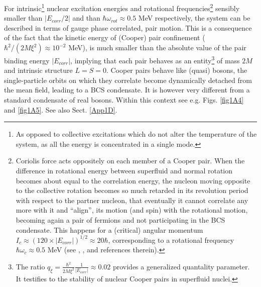 For intrinsic\footnote{As opposed to collective excitations which do not alter the temperature of the system, as all the energy is concentrated in a single mode.} nuclear excitation energies and rotational frequencies\footnote{Coriolis force acts oppositely on each member of a Cooper pair. When the difference in rotational energy between superfluid and normal rotation becomes about equal to the correlation energy, the nucleon moving opposite to the collective rotation becomes so much retarded in its revolution period with respect to the partner nucleon, that eventually it cannot correlate any more with it and ``align'', its motion (and spin) with the rotational motion, becoming again a pair of fermions and not participating in the BCS  condensate. This happens for a (critical) angular momentum $I_c\approx(120\times|E_{corr}|)^{1/2}\approx 20\hbar$, corresponding to a rotational frequency $\hbar\omega_c\approx 0.5$ MeV (see \cite{Bohr:75}, \cite{Brink:05}, \cite{Broglia:13} and references therein).} sensibly smaller than $|E_{corr}/2|$ and than $\hbar\omega_{rot}\approx0.5$ MeV respectively, the system can be described in terms of gauge phase correlated,  pair motion. This is a consequence of the fact that the kinetic energy of (Cooper) pair confinement ($\hbar^2/(2M\xi^2)\approx 10^{-2}$ MeV), is much smaller than the absolute value of the pair binding energy $|E_{corr}|$, implying that each pair behaves as an entity\footnote{The ratio $q_\xi=\frac{\hbar^2}{2M\xi^2}\frac{1}{|E_{corr}|}\approx 0.02$ provides a generalized quantality parameter. It testifies to the stability of nuclear Cooper pairs in superfluid nuclei.} of mass $2M$ and intrinsic structure $L=S=0$. Cooper pairs behave like (quasi) bosons, the single-particle orbits on which they correlate become dynamically detached from the mean field, leading to a BCS condensate. It is however very different from a standard condensate of real bosons. Within this context see e.g. Figs. \ref{fig1A4} and \ref{fig1A5}. See also Sect. \ref{App1D}.

